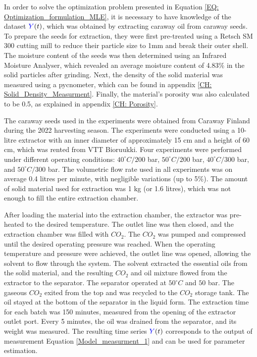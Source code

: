 \documentclass[../Article_Model_Parameters.tex]{subfiles}
\begin{document}
	
	\label{CH: Experiments}
	
	In order to solve the optimization problem presented in Equation \ref{EQ: Optimization_formulation_MLE}, it is necessary to have knowledge of the dataset ${\color{blue}Y}(t)$, which was obtained by extracting caraway oil from caraway seeds. To prepare the seeds for extraction, they were first pre-treated using a Retsch SM 300 cutting mill to reduce their particle size to 1mm and break their outer shell. The moisture content of the seeds was then determined using an Infrared Moisture Analyser, which revealed an average moisture content of 4.83\% in the solid particles after grinding. Next, the density of the solid material was measured using a pycnometer, which can be found in appendix \ref{CH: Solid_Density_Measurment}. Finally, the material's porosity was also calculated to be 0.5, as explained in appendix \ref{CH: Porosity}.
	
	The caraway seeds used in the experiments were obtained from Caraway Finland during the 2022 harvesting season. The experiments were conducted using a 10-litre extractor with an inner diameter of approximately 15 cm and a height of 60 cm, which was rented from VTT Bioruukki. Four experiments were performed under different operating conditions: $40^\circ C / 200$ bar, $50^\circ C / 200$ bar, $40^\circ C / 300$ bar, and $50^\circ C / 300$ bar. The volumetric flow rate used in all experiments was on average 0.4 litres per minute, with negligible variations (up to 5\%). The amount of solid material used for extraction was 1 kg (or 1.6 litres), which was not enough to fill the entire extraction chamber.
	
	After loading the material into the extraction chamber, the extractor was pre-heated to the desired temperature. The outlet line was then closed, and the extraction chamber was filled with $CO_2$. The $CO_2$ was pumped and compressed until the desired operating pressure was reached. When the operating temperature and pressure were achieved, the outlet line was opened, allowing the solvent to flow through the system. The solvent extracted the essential oils from the solid material, and the resulting $CO_2$ and oil mixture flowed from the extractor to the separator. The separator operated at $50^\circ C$ and $50$ bar. The gaseous $CO_2$ exited from the top and was recycled to the $CO_2$ storage tank. The oil stayed at the bottom of the separator in the liquid form. The extraction time for each batch was 150 minutes, measured from the opening of the extractor outlet port. Every 5 minutes, the oil was drained from the separator, and its weight was measured. The resulting time series ${\color{blue}Y}(t)$ corresponds to the output of measurement Equation \ref{Model_measurment_1} and can be used for parameter estimation.
	

	
\end{document}

